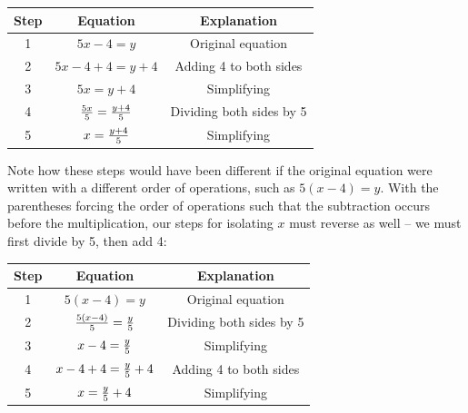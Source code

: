 \begin{center}
\begin{tabular}{| c | c | c |}
\hline 
\textbf{Step} & \textbf{Equation} & \textbf{Explanation} \\[3pt] \hline
1 & $5x - 4 = y$ & Original equation \\[3pt] \hline
2 & $5x - 4 + 4 = y + 4$ & Adding 4 to both sides \\[3pt] \hline
3 & $5x = y + 4$ & Simplifying \\[3pt] \hline
4 & ${5x \over 5} = {{y + 4} \over 5}$ & Dividing both sides by 5 \\[3pt] \hline
5 & $x = {{y + 4} \over 5}$ & Simplifying \\[3pt] \hline
\end{tabular}
\end{center}

Note how these steps would have been different if the original equation were written with a different order of operations, such as $5(x - 4) = y$.  With the parentheses forcing the order of operations such that the subtraction occurs before the multiplication, our steps for isolating $x$ must reverse as well -- we must first divide by 5, then add 4:

\begin{center}
\begin{tabular}{| c | c | c |}
\hline 
\textbf{Step} & \textbf{Equation} & \textbf{Explanation} \\[3pt] \hline
1 & $5(x - 4) = y$ & Original equation \\[3pt] \hline
2 & ${5(x - 4) \over 5} = {y \over 5}$ & Dividing both sides by 5 \\[3pt] \hline
3 & $x - 4 = {y \over 5}$ & Simplifying \\[3pt] \hline
4 & $x - 4 + 4 = {y \over 5} + 4$ & Adding 4 to both sides \\[3pt] \hline
5 & $x = {y \over 5} + 4$ & Simplifying \\[3pt] \hline
\end{tabular}
\end{center}








